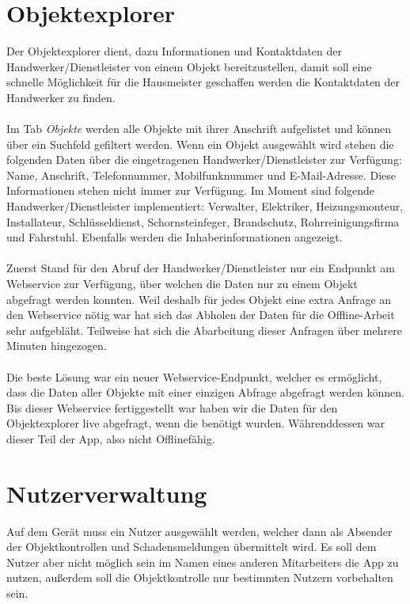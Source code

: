 \documentclass[12pt]{article}
\begin{document}
\section{Objektexplorer}
Der Objektexplorer dient, dazu Informationen und Kontaktdaten der Handwerker/Dienstleister von einem Objekt bereitzustellen, damit soll eine schnelle Möglichkeit für die Hausmeister geschaffen werden die Kontaktdaten der Handwerker zu finden.

\paragraph{}Im Tab \textit{Objekte} werden alle Objekte mit ihrer Anschrift aufgelistet und können über ein Suchfeld gefiltert werden. Wenn ein Objekt ausgewählt wird stehen die folgenden Daten über die eingetragenen Handwerker/Dienstleister zur Verfügung: Name, Anschrift, Telefonnummer, Mobilfunknummer und E-Mail-Adresse. Diese Informationen stehen nicht immer zur Verfügung. Im Moment sind folgende Handwerker/Dienstleister implementiert: Verwalter, Elektriker, Heizungsmonteur, Installateur, Schlüsseldienst, Schornsteinfeger, Brandschutz, Rohrreinigungsfirma und Fahrstuhl. Ebenfalls werden die Inhaberinformationen angezeigt.

\paragraph{}Zuerst Stand für den Abruf der Handwerker/Dienstleister nur ein Endpunkt am Webservice zur Verfügung, über welchen die Daten nur zu einem Objekt abgefragt werden konnten. Weil deshalb für jedes Objekt eine extra Anfrage an den Webservice nötig war hat sich das Abholen der Daten für die Offline-Arbeit sehr aufgebläht. Teilweise hat sich die Abarbeitung dieser Anfragen über mehrere Minuten hingezogen.

\paragraph{}Die beste Lösung war ein neuer Webservice-Endpunkt, welcher es ermöglicht, dass die Daten aller Objekte mit einer einzigen Abfrage abgefragt werden können. Bis dieser Webservice fertiggestellt war haben wir die Daten für den Objektexplorer live abgefragt, wenn die benötigt wurden. Währenddessen war dieser Teil der App, also nicht Offlinefähig.

\section{Nutzerverwaltung}
Auf dem Gerät muss ein Nutzer ausgewählt werden, welcher dann als Absender der Objektkontrollen und Schadensmeldungen übermittelt wird. Es soll dem Nutzer aber nicht möglich sein im Namen eines anderen Mitarbeiters die App zu nutzen, außerdem soll die Objektkontrolle nur bestimmten Nutzern vorbehalten sein.
\end{document}
